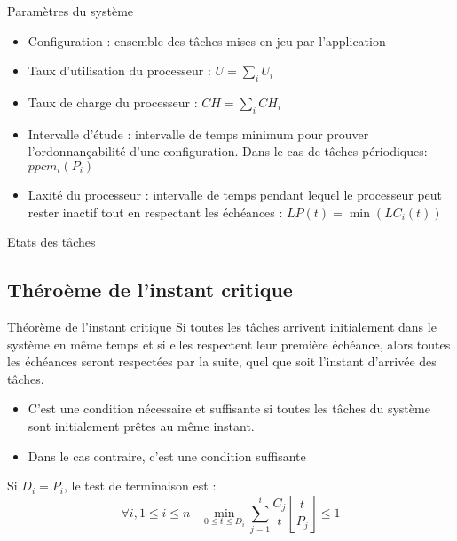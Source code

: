 
\begin{frame}{Paramètres du système}
  \begin{itemize} 
  \item  Configuration  :  ensemble   des  tâches  mises  en  jeu  par
    l'application
  \item Taux d'utilisation du processeur : $U = \sum_i U_i$
  \item Taux de charge du processeur : $CH = \sum_i CH_i$
  \item Intervalle d'étude :  intervalle de temps minimum pour prouver
    l'ordonnançabilité  d'une  configuration. Dans  le  cas de  tâches
    périodiques: $ppcm_i(P_i)$
  \item Laxité du  processeur : intervalle de temps  pendant lequel le
    processeur peut rester inactif  tout en respectant les échéances :
    $ LP(t) = \min(LC_i(t))$
  \end{itemize} 
\end{frame} 

\begin{frame}{Etats des tâches}
  \begin{center}
  \end{center}
\end{frame} 

\subsection{Théroème de l'instant critique}

\begin{frame}{Théorème de l'instant critique}
  Si toutes les  tâches arrivent initialement dans le  système en même
  temps et  si elles respectent  leur première échéance,  alors toutes
  les  échéances  seront  respectées  par  la  suite,  quel  que  soit
  l'instant d'arrivée des tâches.

  \begin{itemize}
  \item  C'est une condition  nécessaire et  suffisante si  toutes les
    tâches du système sont initialement prêtes au même instant.
  \item Dans le cas contraire, c'est une condition suffisante
  \end{itemize}

  Si $D_i = P_i$, le test de terminaison est :
  $$\forall i, 1 \leq i \leq n \;\;\;\min_{0 \leq t \leq D_i}
  \sum_{j=1}^i\frac{C_j}{t}
  \left\lfloor\frac{t}{P_j}\right\rfloor \leq 1$$
\end{frame}

